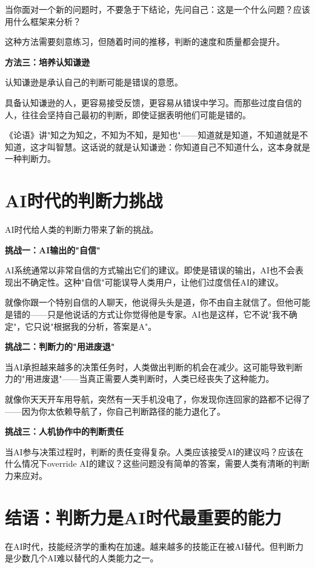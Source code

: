 当你面对一个新的问题时，不要急于下结论，先问自己：这是一个什么问题？应该用什么框架来分析？

这种方法需要刻意练习，但随着时间的推移，判断的速度和质量都会提升。

\textbf{方法三：培养认知谦逊}

认知谦逊是承认自己的判断可能是错误的意愿。

具备认知谦逊的人，更容易接受反馈，更容易从错误中学习。而那些过度自信的人，往往会坚持自己最初的判断，即使证据表明他们可能是错的。

《论语》讲"知之为知之，不知为不知，是知也"——知道就是知道，不知道就是不知道，这才叫智慧。这话说的就是认知谦逊：你知道自己不知道什么，这本身就是一种判断力。

\section{AI时代的判断力挑战}


AI时代给人类的判断力带来了新的挑战。

\textbf{挑战一：AI输出的"自信"}

AI系统通常以非常自信的方式输出它们的建议。即使是错误的输出，AI也不会表现出不确定性。这种"自信"可能误导人类用户，让他们过度信任AI的建议。

就像你跟一个特别自信的人聊天，他说得头头是道，你不由自主就信了。但他可能是错的——只是他说话的方式让你觉得他是专家。AI也是这样，它不说"我不确定"，它只说"根据我的分析，答案是A"。

\textbf{挑战二：判断力的"用进废退"}

当AI承担越来越多的决策任务时，人类做出判断的机会在减少。这可能导致判断力的"用进废退"——当真正需要人类判断时，人类已经丧失了这种能力。

就像你天天开车用导航，突然有一天手机没电了，你发现你连回家的路都不记得了——因为你太依赖导航了，你自己判断路径的能力退化了。

\textbf{挑战三：人机协作中的判断责任}

当AI参与决策过程时，判断的责任变得复杂。人类应该接受AI的建议吗？应该在什么情况下override AI的建议？这些问题没有简单的答案，需要人类有清晰的判断力来应对。

\section{结语：判断力是AI时代最重要的能力}


在AI时代，技能经济学的重构在加速。越来越多的技能正在被AI替代。但判断力是少数几个AI难以替代的人类能力之一。

